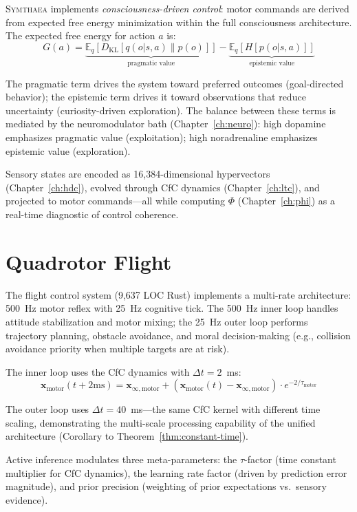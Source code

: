 \documentclass[12pt]{book}
\newcommand{\hvx}{\mathbf{x}}
\newcommand{\symthaea}{\textsc{Symthaea}}
\newcommand{\E}{\mathbb{E}}
\begin{document}
\symthaea{} implements \textit{consciousness-driven control}: motor commands are derived from expected free energy minimization within the full consciousness architecture. The expected free energy for action $a$ is:
\begin{equation}\label{eq:efe}
G(a) = \underbrace{\E_q[D_{\text{KL}}[q(o|s, a) \| p(o)]]}_{\text{pragmatic value}} - \underbrace{\E_q[H[p(o|s, a)]]}_{\text{epistemic value}}
\end{equation}

The pragmatic term drives the system toward preferred outcomes (goal-directed behavior); the epistemic term drives it toward observations that reduce uncertainty (curiosity-driven exploration). The balance between these terms is mediated by the neuromodulator bath (Chapter~\ref{ch:neuro}): high dopamine emphasizes pragmatic value (exploitation); high noradrenaline emphasizes epistemic value (exploration).

Sensory states are encoded as 16,384-dimensional hypervectors (Chapter~\ref{ch:hdc}), evolved through CfC dynamics (Chapter~\ref{ch:ltc}), and projected to motor commands---all while computing $\Phi$ (Chapter~\ref{ch:phi}) as a real-time diagnostic of control coherence.

\section{Quadrotor Flight}

The flight control system (9,637 LOC Rust) implements a multi-rate architecture: 500~Hz motor reflex with 25~Hz cognitive tick. The 500~Hz inner loop handles attitude stabilization and motor mixing; the 25~Hz outer loop performs trajectory planning, obstacle avoidance, and moral decision-making (e.g., collision avoidance priority when multiple targets are at risk).

The inner loop uses the CfC dynamics with $\Delta t = 2$~ms:
\begin{equation}
\hvx_{\text{motor}}(t + 2\text{ms}) = \mathbf{x}_{\infty,\text{motor}} + (\hvx_{\text{motor}}(t) - \mathbf{x}_{\infty,\text{motor}}) \cdot e^{-2/\tau_{\text{motor}}}
\end{equation}

The outer loop uses $\Delta t = 40$~ms---the same CfC kernel with different time scaling, demonstrating the multi-scale processing capability of the unified architecture (Corollary to Theorem~\ref{thm:constant-time}).

Active inference modulates three meta-parameters: the $\tau$-factor (time constant multiplier for CfC dynamics), the learning rate factor (driven by prediction error magnitude), and prior precision (weighting of prior expectations vs.\ sensory evidence).
\end{document}
